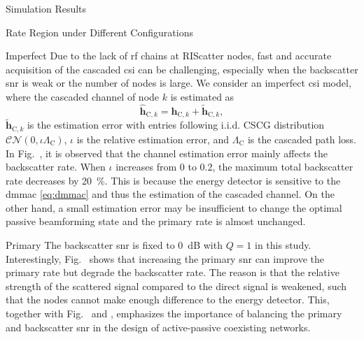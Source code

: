 \begin{section}{Simulation Results}
\begin{subsection}{Rate Region under Different Configurations}

		\begin{subsubsection}{Imperfect }
			Due to the lack of \gls{rf} chains at RIScatter nodes, fast and accurate acquisition of the cascaded \gls{csi} can be challenging, especially when the backscatter \gls{snr} is weak or the number of nodes is large.
			We consider an imperfect \gls{csi} model, where the cascaded channel of node $k$ is estimated as
			\begin{equation}
				\hat{\mathbf{h}}_{\text{C},k} = \mathbf{h}_{\text{C},k} + \tilde{\mathbf{h}}_{\text{C},k},
			\end{equation}
			$\tilde{\mathbf{h}}_{\text{C},k}$ is the estimation error with entries following i.i.d. CSCG distribution $\mathcal{CN}(0, \iota \Lambda_\text{C})$, $\iota$ is the relative estimation error, and $\Lambda_\text{C}$ is the cascaded path loss.
			In Fig.~, it is observed that the channel estimation error mainly affects the backscatter rate.
			When $\iota$ increases from \num{0} to \num{0.2}, the maximum total backscatter rate decreases by \qty{20}{\percent}.
			This is because the energy detector is sensitive to the \gls{dmmac} \eqref{eq:dmmac} and thus the estimation of the cascaded channel.
			On the other hand, a small estimation error may be insufficient to change the optimal passive beamforming state and the primary rate is almost unchanged.
		\end{subsubsection}

		\begin{subsubsection}{Primary }
			\label{sc:primary_snr}
			The backscatter \gls{snr} is fixed to \qty{0}{dB} with $Q=1$ in this study.
			Interestingly, Fig.~ shows that increasing the primary \gls{snr} can improve the primary rate but degrade the backscatter rate.
			The reason is that the relative strength of the scattered signal compared to the direct signal is weakened, such that the nodes cannot make enough difference to the energy detector.
			This, together with Fig.~ and , emphasizes the importance of balancing the primary and backscatter \gls{snr} in the design of active-passive coexisting networks.
		\end{subsubsection}


\end{subsection}
\end{section}
